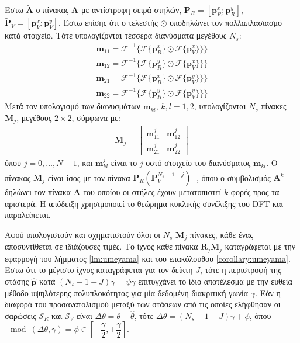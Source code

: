 Έστω $\widetilde{\bm{A}}$ ο πίνακας $\bm{A}$ με αντίστροφη σειρά στηλών,
$\bm{P}_R = [\bm{p}_R^x; \bm{p}_R^y]$,
$\widetilde{\bm{P}}_V = [\bm{p}_V^x; \bm{p}_V^y]$. Έστω επίσης ότι ο τελεστής
$\odot$ υποδηλώνει τον πολλαπλασιασμό κατά στοιχείο. Τότε υπολογίζονται
τέσσερα διανύσματα μεγέθους $N_s$:
\begin{align}
  \bm{m}_{11} = \mathcal{F}^{-1}\{ \mathcal{F}\{\bm{p}_R^x\} \odot \mathcal{F}\{\bm{p}_V^x\} \} \} \nonumber \\
  \bm{m}_{12} = \mathcal{F}^{-1}\{ \mathcal{F}\{\bm{p}_R^y\} \odot \mathcal{F}\{\bm{p}_V^x\} \} \} \nonumber \\
  \bm{m}_{21} = \mathcal{F}^{-1}\{ \mathcal{F}\{\bm{p}_R^x\} \odot \mathcal{F}\{\bm{p}_V^y\} \} \} \nonumber \\
  \bm{m}_{22} = \mathcal{F}^{-1}\{ \mathcal{F}\{\bm{p}_R^y\} \odot \mathcal{F}\{\bm{p}_V^y\} \} \} \nonumber
\end{align}
Μετά τον υπολογισμό των διανυσμάτων $\bm{m}_{kl}$, $k,l = 1,2$, υπολογίζονται
$N_s$ πίνακες $\bm{M}_j$, μεγέθους $2\times2$, σύμφωνα με:
\begin{align}
  \bm{M}_j =
  \begin{bmatrix}
    \bm{m}_{11}^j & \bm{m}_{12}^j \\
    \bm{m}_{21}^j & \bm{m}_{22}^j
  \end{bmatrix}
\end{align}
όπου $j = 0,\dots,N-1$, και $\bm{m}_{kl}^j$ είναι το $j$-οστό στοιχείο του
διανύσματος $\bm{m}_{kl}$. Ο πίνακας $\bm{M}_j$ είναι ίσος με τον πίνακα
$\bm{P}_R (\bm{P}_V^{N_s-1-j})^\top$, όπου ο συμβολισμός $\bm{A}^k$  δηλώνει
τον πίνακα $\bm{A}$ του οποίου οι στήλες έχουν μετατοπιστεί $k$ φορές προς τα
αριστερά. Η απόδειξη χρησιμοποιεί το θεώρημα κυκλικής συνέλιξης του DFT και
παραλείπεται.

Αφού υπολογιστούν και σχηματιστούν όλοι οι $N_s$ $\bm{M}_j$ πίνακες, κάθε ένας
αποσυντίθεται σε ιδιάζουσες τιμές. Το ίχνος κάθε πίνακα $\bm{R}_j \bm{M}_j$
καταγράφεται με την εφαρμογή του λήμματος \ref{lm:umeyama} και του επακόλουθου
\ref{corollary:umeyama}. Έστω ότι το μέγιστο ίχνος καταγράφεται για τον δείκτη
$J$, τότε η περιστροφή της στάσης $\hat{\bm{p}}$ κατά $(N_s-1-J)\gamma =
\psi\gamma$ επιτυγχάνει το ίδιο αποτέλεσμα με την ευθεία μέθοδο υψηλότερης
πολυπλοκότητας για μία δεδομένη διακριτική γωνία $\gamma$. Εάν η διαφορά του
προσανατολισμού μεταξύ των στάσεων από τις οποίες ελήφθησαν οι σαρώσεις
$\mathcal{S}_R$ και $\mathcal{S}_V$ είναι $\Delta\theta = \theta-\hat{\theta}$,
τότε $\Delta\theta = (N_s-1-J)\gamma + \phi$, όπου
$\mod(\Delta\theta, \gamma) = \phi \in [-\dfrac{\gamma}{2},+\dfrac{\gamma}{2}]$.


